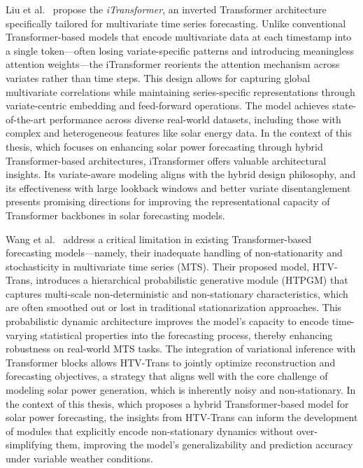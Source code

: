 \documentclass[12pt]{uomthesis}
\begin{document}
Liu et al.\ \cite{liu2023itransformer} propose the \textit{iTransformer}, an inverted Transformer architecture specifically tailored for multivariate time series forecasting. Unlike conventional Transformer-based models that encode multivariate data at each timestamp into a single token—often losing variate-specific patterns and introducing meaningless attention weights—the iTransformer reorients the attention mechanism across variates rather than time steps. This design allows for capturing global multivariate correlations while maintaining series-specific representations through variate-centric embedding and feed-forward operations. The model achieves state-of-the-art performance across diverse real-world datasets, including those with complex and heterogeneous features like solar energy data. In the context of this thesis, which focuses on enhancing solar power forecasting through hybrid Transformer-based architectures, iTransformer offers valuable architectural insights. Its variate-aware modeling aligns with the hybrid design philosophy, and its effectiveness with large lookback windows and better variate disentanglement presents promising directions for improving the representational capacity of Transformer backbones in solar forecasting models.

Wang et al.~\cite{wang2024considering} address a critical limitation in existing Transformer-based forecasting models—namely, their inadequate handling of non-stationarity and stochasticity in multivariate time series (MTS). Their proposed model, HTV-Trans, introduces a hierarchical probabilistic generative module (HTPGM) that captures multi-scale non-deterministic and non-stationary characteristics, which are often smoothed out or lost in traditional stationarization approaches. This probabilistic dynamic architecture improves the model’s capacity to encode time-varying statistical properties into the forecasting process, thereby enhancing robustness on real-world MTS tasks. The integration of variational inference with Transformer blocks allows HTV-Trans to jointly optimize reconstruction and forecasting objectives, a strategy that aligns well with the core challenge of modeling solar power generation, which is inherently noisy and non-stationary. In the context of this thesis, which proposes a hybrid Transformer-based model for solar power forecasting, the insights from HTV-Trans can inform the development of modules that explicitly encode non-stationary dynamics without over-simplifying them, improving the model’s generalizability and prediction accuracy under variable weather conditions.
\end{document}
